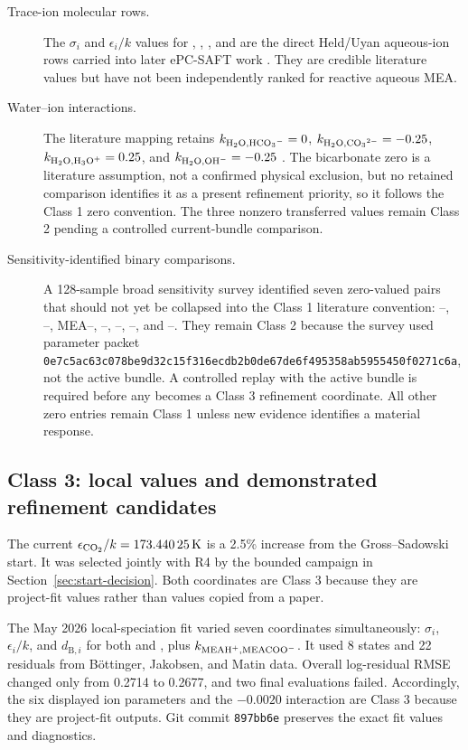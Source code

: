 \documentclass[10pt,oneside]{scrartcl}
\begin{document}
\begin{description}
\item[Trace-ion molecular rows.] The $\sigma_i$ and $\epsilon_i/k$ values
for , , , and  are the direct
Held/Uyan aqueous-ion rows carried into later ePC-SAFT work
\cite{Held2014,Uyan2015,Wangler2018}. They are credible literature values but
have not been independently ranked for reactive aqueous MEA.

\item[Water--ion interactions.] The literature mapping retains
$k_{\ce{H2O},\ce{HCO3-}}=0$, $k_{\ce{H2O},\ce{CO3^2-}}=-0.25$,
$k_{\ce{H2O},\ce{H3O+}}=0.25$, and $k_{\ce{H2O},\ce{OH-}}=-0.25$
\cite{Uyan2015,Wangler2018}. The bicarbonate zero is a literature assumption,
not a confirmed physical exclusion, but no retained comparison identifies it
as a present refinement priority, so it follows the Class 1 zero convention.
The three nonzero transferred values remain Class 2 pending a controlled
current-bundle comparison.

\item[Sensitivity-identified binary comparisons.] A 128-sample broad
sensitivity survey identified seven zero-valued pairs that should not yet be
collapsed into the Class 1 literature convention: --,
--, MEA--, --,
--, --, and
--. They remain Class 2 because the survey used parameter
packet \nolinkurl{0e7c5ac63c078be9d32c15f316ecdb2b0de67de6f495358ab5955450f0271c6a},
not the active bundle. A controlled replay with the active bundle is required
before any becomes a Class 3 refinement coordinate. All other zero entries
remain Class 1 unless new evidence identifies a material response.
\end{description}

\subsection{Class 3: local values and demonstrated refinement candidates}

The current $\epsilon_{\ce{CO2}}/k=\SI{173.44025}{\kelvin}$ is a 2.5\%
increase from the Gross--Sadowski start. It was selected jointly with R4 by
the bounded campaign in Section~\ref{sec:start-decision}. Both coordinates are
Class 3 because they are project-fit values rather than values copied from a
paper.

The May 2026 local-speciation fit varied seven coordinates simultaneously:
$\sigma_i$, $\epsilon_i/k$, and $d_{\mathrm B,i}$ for both  and
, plus $k_{\ce{MEAH+},\ce{MEACOO-}}$. It used 8 states and 22
residuals from B\"ottinger, Jakobsen, and Matin data. Overall log-residual
RMSE changed only from 0.2714 to 0.2677, and two final evaluations failed.
Accordingly, the six displayed ion parameters and the $-0.0020$ interaction
are Class 3 because they are project-fit outputs. Git commit
\texttt{897bb6e} preserves the exact fit values and diagnostics.
\end{document}
